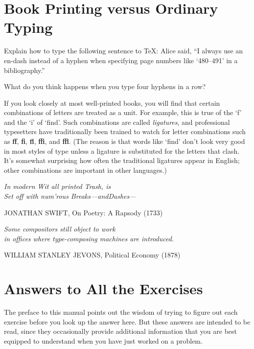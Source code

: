 \documentclass[openany]{ctexbook}
\begin{document}
\chapter{Book Printing versus Ordinary Typing}
\lipsum[1]
\begin{exercise}
  \item Explain how to type the following sentence to \TeX: Alice said, ``I always use an en-dash instead of a hyphen when specifying page numbers like `480--491' in a bibliography.''\par
  \item What do you think happens when you type four hyphens in a row?\par
    If you look closely at most well-printed books, you will find that certain combinations of letters are treated as a unit. For example, this is true of the `f' and the `i' of `find'. Such combinations are called \emph{ligatures}, and professional typesetters have traditionally been trained to watch for letter combinations such as {\bf ff}, {\bf fi}, {\bf fl}, {\bf ffi}, and {\bf ffl}. (The reason is that words like `find' don't look very good in most styles of type unless a ligature is substituted for the letters that clash. It's somewhat surprising how often the traditional ligatures appear in English; other combinations are important in other languages.)
\end{exercise}
\epigraph{\sl In modern Wit all printed Trash, is\\Set off with num’rous Breaks---andDashes---}{JONATHAN SWIFT, On Poetry: A Rapsody (1733)}
\epigraph{\sl Some compositors still object to work\\in offices where type-composing machines are introduced.}{WILLIAM STANLEY JEVONS, Political Economy (1878)}



\stopexercise
\chapter{Answers to All the Exercises}
The preface to this manual points out the wisdom of trying to figure out each exercise before you look up the answer here. But these answers are intended to be read, since they occasionally provide additional information that you are best equipped to understand when you have just worked on a problem.

\printanswer
\end{document}
